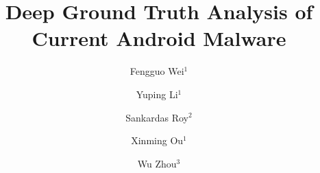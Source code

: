 \documentclass[runningheads,a4paper]{llncs}
\begin{document}
%
\title{Deep Ground Truth Analysis of Current Android Malware}
\author{Fengguo Wei$^1$\and Yuping Li$^1$\and Sankardas Roy$^2$\and Xinming Ou$^1$\and Wu Zhou$^3$}

\maketitle








%
%




{\scriptsize

 
}

%



\end{document}
